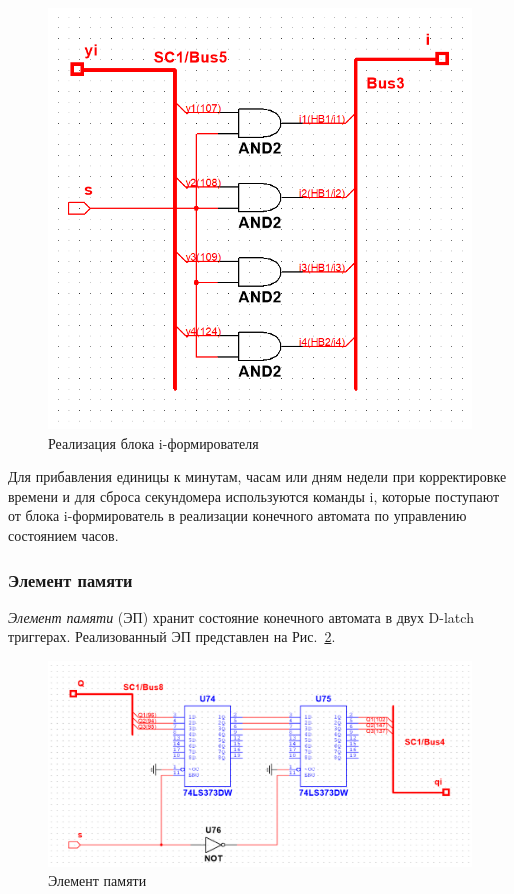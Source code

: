 \documentclass[a4paper, final]{article}
\begin{document}
\begin{figure}[H]
   \centering
   \includegraphics[width=\linewidth]{i_former.png}
   \caption{Реализация блока i-формирователя}
   \label{img:i_former}
\end{figure}

Для прибавления единицы к минутам, часам или дням недели при корректировке времени и для сброса секундомера используются команды i, которые поступают от блока i-формирователь в реализации конечного автомата по управлению состоянием часов.

\subsubsection{Элемент памяти}
\textit{Элемент памяти} (ЭП) хранит состояние конечного автомата в двух D-latch триггерах. Реализованный ЭП представлен на Рис.~\ref{img:memory}.

\begin{figure}[H]
   \centering
   \includegraphics[width=\linewidth]{memory.png}
   \caption{Элемент памяти}
   \label{img:memory}
\end{figure}
\end{document}
